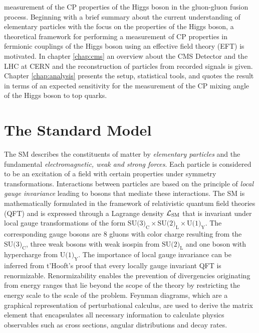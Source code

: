 measurement of the CP properties of the Higgs boson in the gluon-gluon fusion process.
Beginning with a brief summary about the current understanding of elementary particles with the focus on the properties of the Higgs boson, a theoretical framework for performing a measurement of CP properties in fermionic couplings 
of the Higgs boson using an effective field theory (EFT) is motivated. In chapter \ref{chap:cms} an overview about the CMS Detector and the LHC at CERN and the reconstruction of particles from recorded signals is given.
Chapter \ref{chap:analysis} presents the setup, statistical tools, and quotes the result in terms of an expected sensitivity for the measurement of the CP mixing angle of the Higgs boson to top quarks.

\section{The Standard Model}
The SM describes the constituents of matter by \textit{elementary particles} and the fundamental \textit{electromagnetic, weak and strong forces}. 
Each particle is considered to be an excitation of a field with certain properties under symmetry transformations. Interactions between particles are based on the principle of \textit{local gauge invariance} leading to bosons that mediate these interactions. 
The SM is mathematically formulated in the framework of relativistic quantum field theories (QFT) and is expressed through a Lagrange density $\mathcal{L}_\text{SM}$ that is invariant under local gauge transformations of the form $\text{SU(3)}_\text{C} \times \text{SU(2)}_\text{L} \times \text{U(1)}_\text{Y}$. 
The corresponding gauge bosons are 8 gluons with color charge resulting from the $\text{SU(3)}_\text{C}$, three weak bosons with weak isospin from $\text{SU(2)}_\text{L}$ and  one boson with hypercharge from $\text{U(1)}_\text{Y}$.
The importance of local gauge invariance can be inferred from t'Hooft's proof \cite{tHooft:1972tcz} that every locally gauge invariant QFT is renormizable. Renormizability enables the prevention of divergencies originating from energy ranges that lie beyond the scope of the theory by restricting the energy scale to the scale of the problem.
Feynman diagrams, which are a graphical representation of  perturbational calculus, are used to derive the matrix element that encapsulates all necessary information to calculate physics observables such as cross sections, angular distributions and decay rates.

